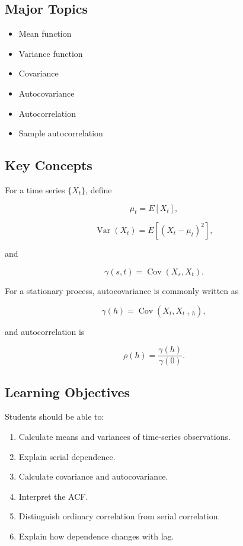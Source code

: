 \documentclass[11pt]{article}
\begin{document}
\subsection{Major Topics}

\begin{itemize}
    \item Mean function
    \item Variance function
    \item Covariance
    \item Autocovariance
    \item Autocorrelation
    \item Sample autocorrelation
\end{itemize}

\subsection{Key Concepts}

For a time series $\{X_t\}$, define

\[
\mu_t = E[X_t],
\]

\[
\operatorname{Var}(X_t)
=
E[(X_t-\mu_t)^2],
\]

and

\[
\gamma(s,t)
=
\operatorname{Cov}(X_s,X_t).
\]

For a stationary process, autocovariance is commonly written as

\[
\gamma(h)
=
\operatorname{Cov}(X_t,X_{t+h}),
\]

and autocorrelation is

\[
\rho(h)
=
\frac{\gamma(h)}{\gamma(0)}.
\]

\subsection{Learning Objectives}

Students should be able to:

\begin{enumerate}
    \item Calculate means and variances of time-series observations.
    \item Explain serial dependence.
    \item Calculate covariance and autocovariance.
    \item Interpret the ACF.
    \item Distinguish ordinary correlation from serial correlation.
    \item Explain how dependence changes with lag.
\end{enumerate}
\end{document}
